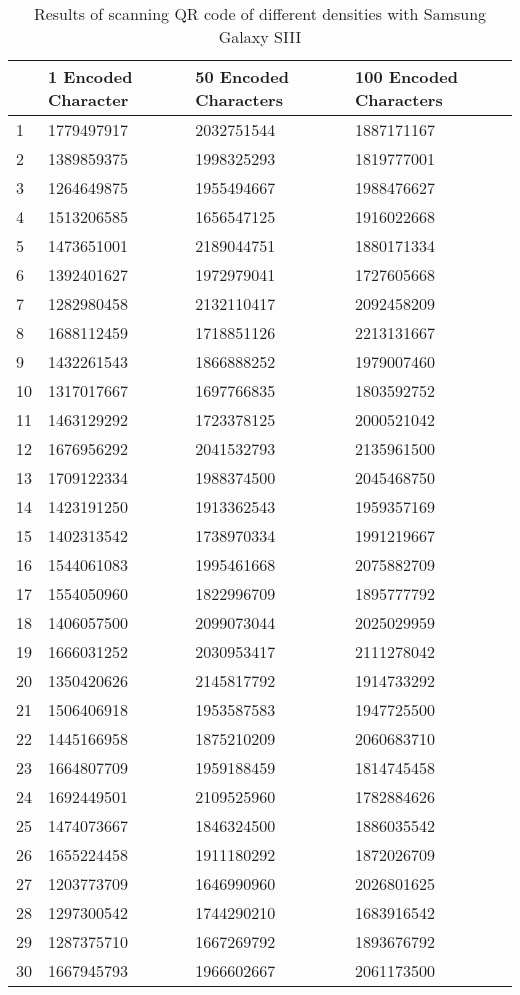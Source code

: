 	\begin{table}[ht!]
    		\caption{Results of scanning QR code of different densities with Samsung Galaxy SIII} \label{tab:distamceGoogleGlassFull}
		\centering \begin{tabularx}{\textwidth}{l|X|X|X} \hline
		& \textbf{1 Encoded Character} & \textbf{50 Encoded Characters} & \textbf{100 Encoded Characters} \\ \hline \hline
		
		1&	1779497917	&	2032751544	&	1887171167	\\ \hline
		2&	1389859375	&	1998325293	&	1819777001	\\ \hline
		3&	1264649875	&	1955494667	&	1988476627	\\ \hline
		4&	1513206585	&	1656547125	&	1916022668	\\ \hline
		5&	1473651001	&	2189044751	&	1880171334	\\ \hline
		6&	1392401627	&	1972979041	&	1727605668	\\ \hline
		7&	1282980458	&	2132110417	&	2092458209	\\ \hline
		8&	1688112459	&	1718851126	&	2213131667	\\ \hline
		9&	1432261543	&	1866888252	&	1979007460	\\ \hline
		10&	1317017667	&	1697766835	&	1803592752	\\ \hline
		11&	1463129292	&	1723378125	&	2000521042	\\ \hline
		12&	1676956292	&	2041532793	&	2135961500	\\ \hline
		13&	1709122334	&	1988374500	&	2045468750	\\ \hline
		14&	1423191250	&	1913362543	&	1959357169	\\ \hline
		15&	1402313542	&	1738970334	&	1991219667	\\ \hline
		16&	1544061083	&	1995461668	&	2075882709	\\ \hline
		17&	1554050960	&	1822996709	&	1895777792	\\ \hline
		18&	1406057500	&	2099073044	&	2025029959	\\ \hline
		19&	1666031252	&	2030953417	&	2111278042	\\ \hline
		20&	1350420626	&	2145817792	&	1914733292	\\ \hline
		21&	1506406918	&	1953587583	&	1947725500	\\ \hline
		22&	1445166958	&	1875210209	&	2060683710	\\ \hline
		23&	1664807709	&	1959188459	&	1814745458	\\ \hline
		24&	1692449501	&	2109525960	&	1782884626	\\ \hline
		25&	1474073667	&	1846324500	&	1886035542	\\ \hline
		26&	1655224458	&	1911180292	&	1872026709	\\ \hline
		27&	1203773709	&	1646990960	&	2026801625	\\ \hline
		28&	1297300542	&	1744290210	&	1683916542	\\ \hline
		29&	1287375710	&	1667269792	&	1893676792	\\ \hline
		30&	1667945793	&	1966602667	&	2061173500	\\ \hline
		
		\end{tabularx}
	\end{table}